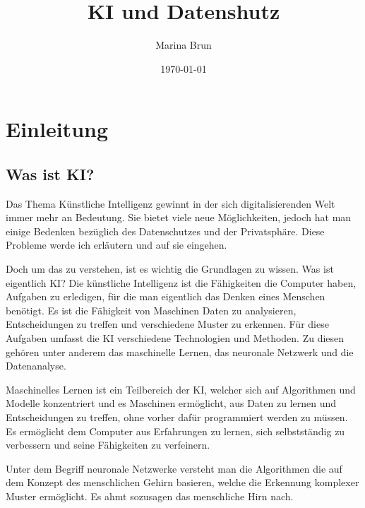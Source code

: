 \documentclass{report}
\title{KI und Datenshutz}
\author{Marina Brun}
\date{\today}
\begin{document}
\maketitle


\tableofcontents

\chapter{Einleitung}

\section{Was ist KI?}

Das Thema Künstliche Intelligenz gewinnt in der sich digitalisierenden Welt immer mehr an Bedeutung. Sie bietet viele neue Möglichkeiten, jedoch hat man einige Bedenken bezüglich des Datenschutzes und der Privatsphäre. Diese Probleme werde ich erläutern und auf sie eingehen.

\vspace{2mm}Doch um das zu verstehen, ist es wichtig die Grundlagen zu wissen. Was ist eigentlich KI? Die künstliche Intelligenz ist die Fähigkeiten die Computer haben, Aufgaben zu erledigen, für die man eigentlich das Denken eines Menschen benötigt. Es ist die Fähigkeit von Maschinen Daten zu analysieren, Entscheidungen zu treffen und verschiedene Muster zu erkennen. Für diese Aufgaben umfasst die KI verschiedene Technologien und Methoden. Zu diesen gehören unter anderem das maschinelle Lernen, das neuronale Netzwerk und die Datenanalyse.

\vspace{2mm}Maschinelles Lernen ist ein Teilbereich der KI, welcher sich auf Algorithmen und Modelle konzentriert und es Maschinen ermöglicht, aus Daten zu lernen und Entscheidungen zu treffen, ohne vorher dafür programmiert werden zu müssen. Es ermöglicht dem Computer aus Erfahrungen zu lernen, sich selbstständig zu verbessern und seine Fähigkeiten zu verfeinern.

\vspace{2mm}Unter dem Begriff neuronale Netzwerke versteht man die Algorithmen die auf dem Konzept des menschlichen Gehirn basieren, welche die Erkennung komplexer Muster ermöglicht.  Es ahmt sozusagen das menschliche Hirn nach.
\end{document}
